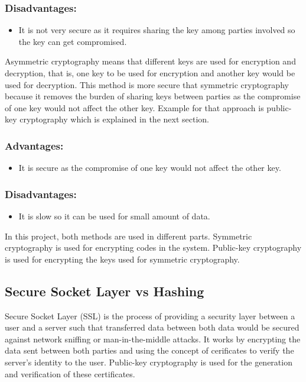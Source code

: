 \subsubsection{Disadvantages:}
\begin{itemize}
    \item It is not very secure as it requires sharing the key among parties involved so the key can get compromised.
\end{itemize}

Asymmetric cryptography means that different keys are used for encryption and decryption, that is, one key to be used for encryption and another key would be used for decryption. This method is more secure that symmetric cryptography because it removes the burden of sharing keys between parties as the compromise of one key would not affect the other key. Example for that approach is public-key cryptography which is explained in the next section.

\subsubsection{Advantages:}
\begin{itemize}
    \item It is secure as the compromise of one key would not affect the other key.
\end{itemize}

\subsubsection{Disadvantages:}
\begin{itemize}
    \item It is slow so it can be used for small amount of data.
\end{itemize}

In this project, both methods are used in different parts. Symmetric cryptography is used for encrypting codes in the system. Public-key cryptography is used for encrypting the keys used for symmetric cryptography.

\subsection{Secure Socket Layer vs Hashing}
Secure Socket Layer (SSL) is the process of providing a security layer between a user and a server such that transferred data between both data would be secured against network sniffing or man-in-the-middle attacks. It works by encrypting the data sent between both parties and using the concept of cerificates to verify the server's identity to the user. Public-key cryptography is used for the generation and verification of these certificates.

